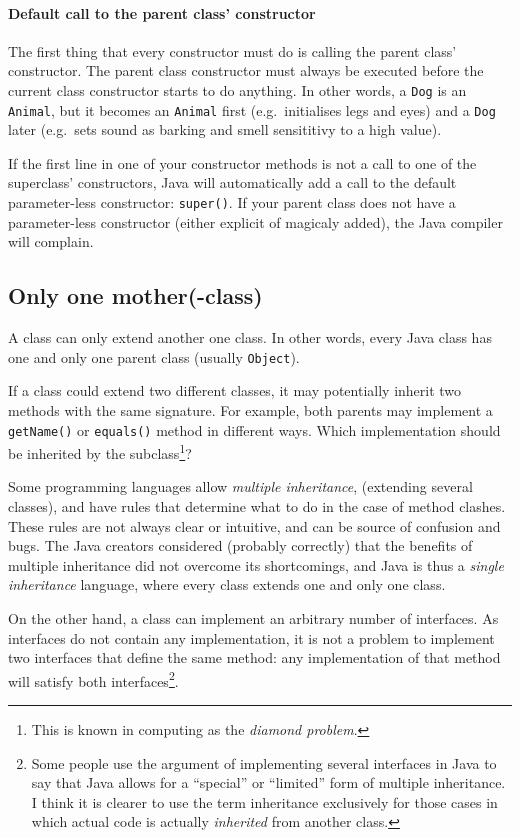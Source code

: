 \paragraph{Default call to the parent class' constructor}
\label{sec:default-call-parent}

The first thing that every constructor must do is calling the parent
class' constructor. The parent class constructor must always be
executed before the current class constructor starts to do
anything. In other words, a \verb+Dog+ is an \verb+Animal+, but it
becomes an \verb+Animal+ first (e.g.~initialises legs and eyes) and a
\verb+Dog+ later (e.g.~sets sound as barking and smell sensititivy to
a high value).

If the first line in one of your constructor methods is not a call to
one of the superclass' constructors, Java will automatically add a
call to the default parameter-less constructor: \verb+super()+. If
your parent class does not have a parameter-less constructor (either
explicit of magicaly added), the Java compiler will complain. 

\subsection{Only one mother(-class)}
\label{sec:limits-inheritance}

A class can only extend another one class. In other words, every Java
class has one and only one parent class (usually \verb+Object+). 

If a class could extend two different classes, it may potentially
inherit two methods with the same signature. For example, both parents
may implement a \verb+getName()+ or \verb+equals()+ method in
different ways. Which implementation should be inherited by the
subclass\footnote{This is known in computing as the \emph{diamond
    problem}.}?

Some programming languages allow \emph{multiple inheritance},
(extending several classes), and have rules that determine what to do
in the case of method clashes. These rules are not always clear or
intuitive, and can be source of confusion and bugs. The Java creators
considered (probably correctly) that the benefits of multiple
inheritance did not overcome its shortcomings, and Java is thus a
\emph{single inheritance} language, where every class extends one and
only one class. 

On the other hand, a class can implement an arbitrary number of
interfaces. As interfaces do not contain any implementation, it is not
a problem to implement two interfaces that define the same method: any
implementation of that method will satisfy both
interfaces\footnote{Some people use the argument of implementing
  several interfaces in Java to say that Java allows for a ``special''
  or ``limited'' form of multiple inheritance. I think it is clearer
  to use the term inheritance exclusively for those cases 
  in which actual code is
  actually \emph{inherited} from another class. }. 

